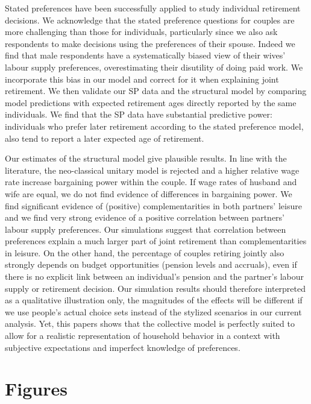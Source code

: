 \documentclass[11pt,letter]{article}
\begin{document}
Stated preferences have been successfully applied to study individual retirement decisions. We acknowledge that the stated preference questions for couples are more challenging than those for individuals, particularly since we also ask respondents to make decisions using the preferences of their spouse. Indeed we find that male respondents have a systematically biased view of their wives' labour supply preferences, overestimating their disutility of doing paid work. We incorporate this bias in our model and correct for it when explaining joint retirement. We then validate our SP data and the structural model by comparing model predictions with expected retirement ages directly reported by the same individuals. We find that the SP data have substantial predictive power: individuals who prefer later retirement according to the stated preference model, also tend to report a later expected age of retirement.

Our estimates of the structural model give plausible results. In line with the literature, the neo-classical unitary model is rejected and a higher relative wage rate increase bargaining power within the couple. If wage rates of husband and wife are equal, we do not find evidence of differences in bargaining power. We find significant evidence of (positive) complementarities in both partners' leisure and we find very strong evidence of a positive correlation between partners' labour supply preferences. Our simulations suggest that correlation between preferences explain a much larger part of joint retirement than complementarities in leisure. On the other hand, the percentage of couples retiring jointly also strongly depends on budget opportunities (pension levels and accruals), even if there is no explicit link between an individual's pension and the partner's labour supply or retirement decision. Our simulation results should therefore interpreted as a qualitative illustration only, the magnitudes of the effects will be different if we use people's actual choice sets instead of the stylized scenarios in our current analysis. Yet, this papers shows that the collective model is perfectly suited to allow for a realistic representation of household behavior in a context with subjective expectations and imperfect knowledge of preferences.




\newpage
\section*{Figures}
\end{document}
